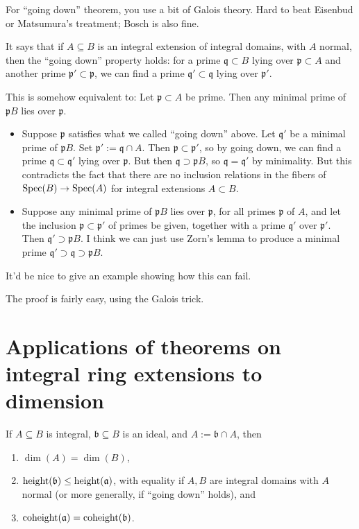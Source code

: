 \documentclass[reqno]{amsart}
\begin{document}
For ``going down'' theorem, you use a bit of Galois theory.
Hard to beat Eisenbud or Matsumura's treatment; Bosch is also fine.

It says that if \(A \subseteq B\) is an integral extension of
integral domains, with \(A\) normal, then the ``going down''
property holds: for a prime \(\mathfrak{q} \subset B\) lying over
\(\mathfrak{p} \subset A\) and another prime
\(\mathfrak{p} ' \subset \mathfrak{p}\), we can find a prime
\(\mathfrak{q} ' \subset \mathfrak{q}\) lying over
\(\mathfrak{p}'\).

This is somehow equivalent to: Let \(\mathfrak{p} \subset A\) be
prime.  Then any minimal prime of \(\mathfrak{p} B\) lies over
\(\mathfrak{p}\).
\begin{itemize}
\item Suppose $\mathfrak{p}$ satisfies what we called ``going
  down'' above.  Let $\mathfrak{q}'$ be a minimal prime of
  $\mathfrak{p} B$.  Set
  $\mathfrak{p} ' := \mathfrak{q} \cap A$.  Then
  $\mathfrak{p} \subset \mathfrak{p}'$, so by going down, we can
  find a prime $\mathfrak{q} \subset \mathfrak{q} '$ lying over
  $\mathfrak{p}$.  But then
  $\mathfrak{q} \supset \mathfrak{p} B$, so
  $\mathfrak{q} = \mathfrak{q} '$ by minimality.  But this
  contradicts the fact that there are no inclusion relations in
  the fibers of $\operatorname{Spec}(B) \rightarrow \operatorname{Spec}(A)$ for integral
  extensions $A \subset B$.
\item Suppose any minimal prime of $\mathfrak{p} B$ lies over
  $\mathfrak{p}$, for all primes $\mathfrak{p}$ of $A$, and let
  the inclusion $\mathfrak{p} \subset \mathfrak{p}'$ of primes
  be given, together with a prime $\mathfrak{q}'$ over
  $\mathfrak{p}'$.  Then $\mathfrak{q}' \supset \mathfrak{p} B$.
  I think we can just use Zorn's lemma to produce a minimal
  prime
  $\mathfrak{q} ' \supset \mathfrak{q} \supset \mathfrak{p} B$.
\end{itemize}

It'd be nice to give an example showing how this can fail.

The proof is fairly easy, using the Galois trick.


\section{Applications of theorems on integral ring extensions to dimension}
\label{sec:org04b0a0a}

If \(A \subseteq B\) is integral,
\(\mathfrak{b} \subseteq B\) is an ideal,
and \(A := \mathfrak{b} \cap A\),
then
\begin{enumerate}
\item $\dim(A) = \dim(B)$,
\item $\operatorname{height}(\mathfrak{b}) \leq \operatorname{height}(\mathfrak{a})$,
  with equality if $A,B$ are integral domains
  with $A$ normal (or more generally, if ``going down'' holds), and
\item $\operatorname{coheight}(\mathfrak{a}) = \operatorname{coheight}(\mathfrak{b})$.
\end{enumerate}
\end{document}
